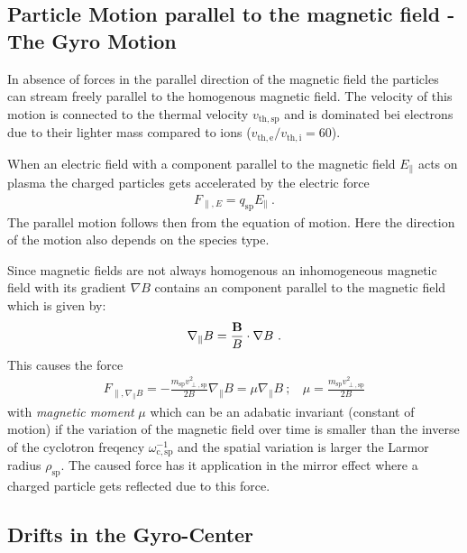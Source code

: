 \newpage

\subsection{Particle Motion parallel to the magnetic field - The Gyro Motion}
\label{sub:parallelmotion}

In absence of forces in the parallel direction of the magnetic field the particles can stream freely parallel to the homogenous magnetic field. The velocity of this motion is connected to the thermal velocity $v_\mathrm{th,sp}$ and is dominated bei electrons due to their lighter mass compared to ions ($v_\mathrm{th,e}/v_\mathrm{th,i} = 60$). 

When an electric field with a component parallel to the magnetic field $E_\parallel$ acts on plasma the charged particles gets accelerated by the electric force
\begin{gather}
    F_{\parallel,E} = q_\mathrm{sp}E_\parallel~.
\end{gather}
The parallel motion follows then from the equation of motion. Here the direction of the motion also depends on the species type.

Since magnetic fields are not always homogenous an inhomogeneous magnetic field with its gradient $\nabla B$ contains an component parallel to the magnetic field which is given by:
\begin{gather}
    \nabla_\parallel B = \frac{\boldsymbol{\mathbf{B}}}{B} \cdot \nabla B~.
\end{gather}
This causes the force
\begin{gather}
    F_{\parallel,\nabla_\parallel B} = - \frac{m_\mathrm{sp}v^2_{\perp,\mathrm{sp}}}{2B} \nabla_\parallel B = \mu \nabla_\parallel B~;~~~~\mu = \frac{m_\mathrm{sp}v^2_{\perp,\mathrm{sp}}}{2B}
\end{gather}
with \textit{magnetic moment} $\mu$ which can be an adabatic invariant (constant of motion) if the variation of the magnetic field over time is smaller than the inverse of the cyclotron freqency $\omega^{-1}_\mathrm{c,sp}$ and the spatial variation is larger the Larmor radius $\rho_\mathrm{sp}$. The caused force has it application in the mirror effect where a charged particle gets reflected due to this force.

\newpage

\subsection{Drifts in the Gyro-Center}
\label{sub:drift}

